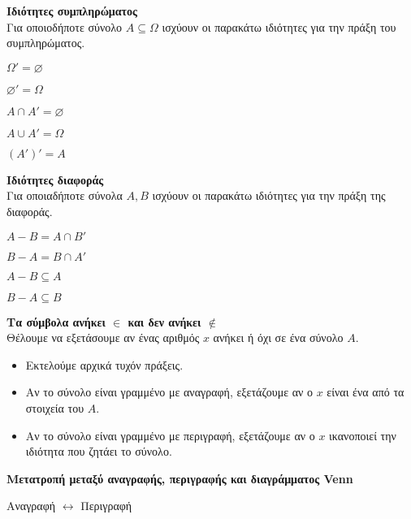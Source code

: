 \documentclass[twoside,nofonts,internet,math,spyros]{frontisthrio}
\begin{document}
\begin{arithmisi}
\begin{center}
\end{center}
\item\textbf{Ιδιότητες συμπληρώματος}\\
Για οποιοδήποτε σύνολο $ A\subseteq\Omega $ ισχύουν οι παρακάτω ιδιότητες για την πράξη του συμπληρώματος.
\begin{multicols}{2}
\begin{rlist}
\item $ \Omega'=\varnothing $
\item $ \varnothing'=\Omega $
\item $ A\cap A'=\varnothing $
\item $ A\cup A'=\Omega $
\item $ (A')'=A $
\end{rlist}
\end{multicols}
\item\textbf{Ιδιότητες διαφοράς}\\
Για οποιαδήποτε σύνολα $ A,B $ ισχύουν οι παρακάτω ιδιότητες για την πράξη της διαφοράς.
\begin{multicols}{2}
\begin{rlist}
\item $ A-B=A\cap B' $
\item $ B-A=B\cap A' $
\item $ A-B\subseteq A $
\item $ B-A\subseteq B $
\end{rlist}
\end{multicols}
\end{arithmisi}
\methodologia
\begin{arithmisi}
\item\textbf{Τα σύμβολα ανήκει $ \in $ και δεν ανήκει $ \notin $}\\
Θέλουμε να εξετάσουμε αν ένας αριθμός $ x $ ανήκει ή όχι σε ένα σύνολο $ A $.
\begin{itemize}
\item Εκτελούμε αρχικά τυχόν πράξεις.
\item Αν το σύνολο είναι γραμμένο με αναγραφή, εξετάζουμε αν ο $ x $ είναι ένα από τα στοιχεία του $ A $.
\item Αν το σύνολο είναι γραμμένο με περιγραφή, εξετάζουμε αν ο $ x $ ικανοποιεί την ιδιότητα που ζητάει το σύνολο. 
\end{itemize}
\item\textbf{Μετατροπή μεταξύ αναγραφής, περιγραφής και διαγράμματος Venn}
\begin{rlist}
\item Αναγραφή $ \leftrightarrow $ Περιγραφή
\begin{bhma}
\item 
\end{bhma}
\end{rlist}
\end{arithmisi}
\end{document}
